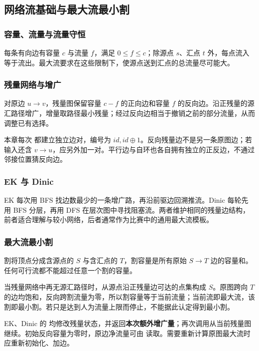 \subsection{网络流基础与最大流最小割}
\label{math:flow-basics}
\subsubsection*{容量、流量与流量守恒}
每条有向边有容量 $c$ 与流量 $f$，满足 $0\le f\le c$；除源点 $s$、汇点 $t$ 外，每点流入等于流出。最大流要求在这些限制下，使源点送到汇点的总流量尽可能大。

\subsubsection*{残量网络与增广}
对原边 $u\to v$，残量图保留容量 $c-f$ 的正向边和容量 $f$ 的反向边。沿正残量的源汇路径增广，增量取路径最小残量；经过反向边相当于撤销之前的部分流量，从而调整已有选择。

本章每次  都建立独立边对，编号为 $id,id\mathbin{\oplus}1$。反向残量边不是另一条原图边；若输入还含 $v\to u$，应另外加一对。平行边与自环也各自拥有独立的正反边，不通过邻接位置猜反向边。

\subsubsection*{EK 与 Dinic}
EK 每次用 BFS 找边数最少的一条增广路，再沿前驱边回溯推流。Dinic 每轮先用 BFS 分层，再用 DFS 在层次图中寻找阻塞流。两者维护相同的残量边结构，前者适合理解与较小网络，后者通常作为比赛中的通用最大流模板。

\subsubsection*{最大流最小割}
割将顶点分成含源点的 $S$ 与含汇点的 $T$，割容量是所有原始 $S\to T$ 边的容量和。任何可行流都不能超过任意一个割的容量。

当残量网络中再无源汇路径时，从源点沿正残量边可达的点集构成 $S$。原图跨向 $T$ 的边均饱和，反向跨割流量为零，所以割容量等于当前流量；当前流即最大流，该割即最小割。若只是达到人为流量上限而停止，不能据此认定得到最小割。

EK、Dinic 的  均修改残量状态，并返回\textbf{本次额外增广量}；再次调用从当前残量图继续。初始反向容量为零时，原边净流量可由  读取。需要重新计算原图最大流时应重新初始化、加边。
